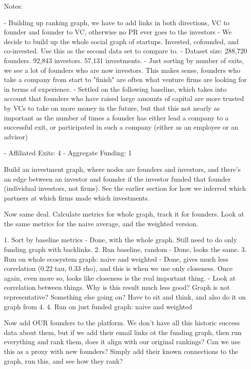 Notes:

- Building up ranking graph, we have to add links in both directions, VC to founder and founder to VC, otherwise no PR ever goes to the investors
- We decide to build up the whole social graph of startups. Invested, cofounded, and co-invested. Use this as the second data set to compare to.
- Dataset size: 288,720 founders. 92,843 investors. 57,131 investments.
- Just sorting by number of exits, we see a lot of founders who are now investors. This makes sense, founders who take a company from start to "finish" are often what venture firms are looking for in terms of experience.
- Settled on the following baseline, which takes into account that founders who have raised large amounts of capital are more trusted by VCs to take on more money in the future, but that this not nearly as important as the number of times a founder has either lead a company to a successful exit, or participated in such a company (either as an employee or an advisor)

- Affiliated Exits: 4
- Aggregate Funding: 1

Build an investment graph, where nodes are founders and investors, and there's an edge between an investor and founder if the investor funded that founder (individual investors, not firms). See the earlier section for how we inferred which partners at which firms made which investments.

Now same deal. Calculate metrics for whole graph, track it for founders. Look at the same metrics for the naive average, and the weighted version.

1. Sort by baseline metrics
  - Done, with the whole graph. Still need to do only funding graph with backlinks.
2. Run baseline, random
  - Done, looks the same.
3. Run on whole ecosystem graph: naive and weighted
  - Done, gives much less correlation (0.22 tau, 0.33 rho), and this is when we use only closeness. Once again, even more so, looks like closeness is the real important thing.
  - Look at correlation between things. Why is this result much less good? Graph is not representative? Something else going on? Have to sit and think, and also do it on graph from 4.
4. Run on just funded graph: naive and weighted


Now add OUR founders to the platform. We don't have all this historic success data about them, but if we add their email links ot the funding graph, then run everything and rank them, does it align with our original rankings? Can we use this as a proxy with new founders? Simply add their known connections to the graph, run this, and see how they rank?

